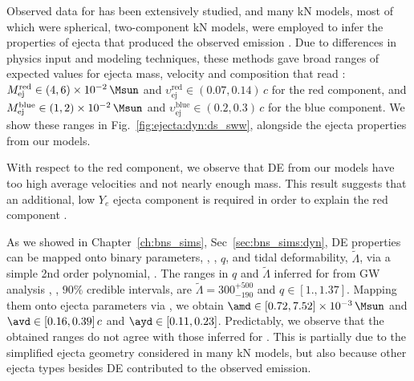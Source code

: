 Observed data for \AT{} has been extensively studied, and many \ac{kN} models, most of which were spherical, two-component \ac{kN} models, 
were employed to infer the properties of ejecta that produced the observed 
emission \citep[\eg][]{Villar:2017wcc}. 
%
Due to differences in physics input and modeling techniques, these methods gave 
broad ranges of expected values for ejecta mass, velocity and composition 
that read \citep{Siegel:2019mlp}:
%
$M_{\text{ej}}^{\text{red}}\in(4, 6)\times10^{-2}\,\Msun$ and
$\upsilon_{\text{ej}}^{\text{red}}\in(0.07, 0.14)\,c$ for the red component, and 
$M_{\text{ej}}^{\text{blue}}\in(1, 2)\times10^{-2}\,\Msun$ and 
$\upsilon_{\text{ej}}^{\text{blue}}\in(0.2, 0.3)\,c$ for the blue component.
%
We show these ranges in Fig.~\ref{fig:ejecta:dyn:ds_sww}, alongside the 
ejecta properties from our models. 


With respect to the red component, we observe that \ac{DE} from our models 
have too high average velocities and not nearly enough mass.
This result suggests that an additional, low $Y_e$ ejecta component 
is required in order to explain the \AT{} red component 
\citep[\eg][]{Perego:2017wtu,Kawaguchi:2018ptg}.
%

As we showed in Chapter~\ref{ch:bns_sims}, Sec~\ref{sec:bns_sims:dyn}, 
\ac{DE} properties can be mapped onto binary parameters, \eg, 
\mr, $q$, and tidal deformability, $\tilde{\Lambda}$, via a simple 
2nd order polynomial, \polql{}. 
%
The ranges in $q$ and $\tilde{\Lambda}$ inferred for \GW{} from \ac{GW} analysis 
\citep{TheLIGOScientific:2017qsa,Abbott:2018wiz,De:2018uhw,Abbott:2018exr}, 
\ie,  $90\%$ credible intervals, are 
$\tilde{\Lambda}=300_{-190}^{+500}$ and $q\in[1., 1.37]$. 
%
Mapping them onto ejecta parameters via \polql{}, we obtain 
%
$\amd \in [0.72, 7.52] \times 10^{-3}\, \Msun$
and
$\avd \in [0.16, 0.39]\, c$
and 
$\ayd \in [0.11, 0.23]$.
%
Predictably, we observe that the obtained ranges do not agree with those 
inferred for \AT{}. 
This is partially due to the simplified ejecta 
geometry considered in many \ac{kN} models, but also because other 
ejecta types besides \ac{DE} contributed to the observed emission.

%







